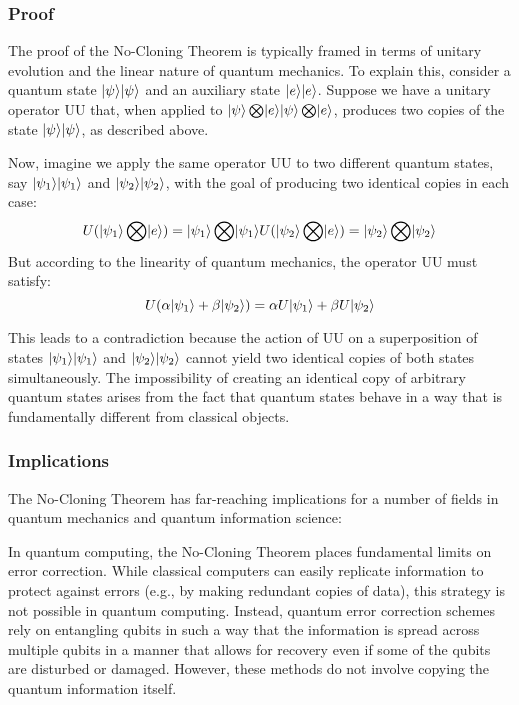 \subsubsection{Proof}
The proof of the No-Cloning Theorem is typically framed in terms of unitary evolution
and the linear nature of quantum mechanics.
To explain this, consider a quantum state $\lvert\psi\rangle\lvert\psi\rangle$ and an auxiliary state $\lvert e\rangle\lvert e\rangle$.
Suppose we have a unitary operator UU that, when applied to
$\lvert\psi\rangle\bigotimes\lvert e\rangle\lvert\psi\rangle\bigotimes\lvert e\rangle$,
produces two copies of the state $\lvert\psi\rangle\lvert\psi\rangle$, as described above.

Now, imagine we apply the same operator UU to two different quantum states,
say $\lvert\psi_1\rangle\lvert\psi_1\rangle$ and $\lvert\psi_2\rangle\lvert\psi_2\rangle$, 
with the goal of producing two identical copies in each case:
\begin{equation}
    U(\lvert\psi_1\rangle\bigotimes\lvert e\rangle)=\lvert\psi_1\rangle\bigotimes\lvert\psi_1\rangle
    U(\lvert\psi_2\rangle\bigotimes\lvert e\rangle)=\lvert\psi_2\rangle\bigotimes\lvert\psi_2\rangle \label{eq:cloning_two_sates}
\end{equation}
But according to the linearity of quantum mechanics, the operator UU must satisfy:
\begin{equation}
    U(\alpha\lvert\psi_1\rangle+\beta\lvert\psi_2\rangle)=\alpha U\lvert\psi_1\rangle+\beta U\lvert\psi_2\rangle
    \label{eq:cloning_linearity_distribution}
\end{equation}

This leads to a contradiction because the action of UU on a superposition of states 
$\lvert\psi_1\rangle\lvert\psi_1\rangle$ and $\lvert\psi_2\rangle\lvert\psi_2\rangle$
cannot yield two identical copies of both states simultaneously.
The impossibility of creating an identical copy of arbitrary quantum states arises from the fact that
quantum states behave in a way that is fundamentally different from classical objects.

\subsubsection{Implications}
The No-Cloning Theorem has far-reaching implications for a number of fields in
quantum mechanics and quantum information science:

In quantum computing, the No-Cloning Theorem places fundamental limits on error correction.
While classical computers can easily replicate information to protect against errors
(e.g., by making redundant copies of data), this strategy is not possible in quantum computing.
Instead, quantum error correction schemes rely on entangling qubits in such a way that the information is spread across
multiple qubits in a manner that allows for recovery even if some of the qubits are disturbed or damaged.
However, these methods do not involve copying the quantum information itself.

